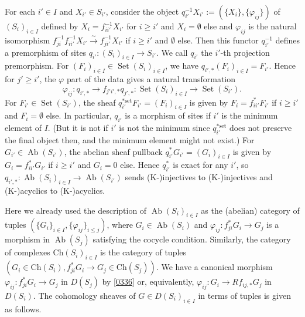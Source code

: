\documentclass{amsart}
\theoremstyle{remark}
\numberwithin{equation}{subsection}
\newcommand{\isomto}{\overset{\sim}{\to}}
\newcommand{\set}{\mathrm{set}}
\newcommand{\Ch}{\mathrm{Ch}}
\DeclareMathOperator{\Ab}{Ab}
\DeclareMathOperator{\Set}{Set}
\begin{document}
For each $i' \in I$ and $X_{i'} \in S_{i'}$,
consider the object $q_{i'}^{-1} X_{i'} := (\{X_{i}\}, \{\varphi_{i j}\})$
of $(S_{i})_{i \in I}$ defined by
$X_{i} =  f_{i i'}^{-1} X_{i'}$ for $i \ge i'$ and $X_{i} = \emptyset$ else
and $\varphi_{i j}$ is the natural isomorphism
$f_{j i}^{-1} f_{i i'}^{-1} X_{i'} \isomto f_{j i'}^{-1} X_{i'}$ if $i \ge i'$
and $\emptyset$ else.
Then this functor $q_{i'}^{-1}$ defines a premorphism of sites
$q_{i'} \colon (S_{i})_{i \in I} \to S_{i'}$.
We call $q_{i'}$ the $i'$-th projection premorphism.
For $(F_{i})_{i \in I} \in \Set(S_{i})_{i \in I}$,
we have $q_{i', \ast}(F_{i})_{i \in I} = F_{i'}$.
Hence for $j' \ge i'$, the $\varphi$ part of the data gives a natural transformation
	\begin{equation} \label{0336}
			\varphi_{i j}
		\colon
			q_{i', \ast}
		\to
			f_{j' i', \ast} q_{j', \ast}
		\colon
			\Set(S_{i})_{i \in I}
		\to
			\Set(S_{i'}).
	\end{equation}
For $F_{i'} \in \Set(S_{i'})$,
the sheaf $q_{i'}^{\ast \set} F_{i'} = (F_{i})_{i \in I}$ is given by
$F_{i} = f_{i i'}^{\ast} F_{i'}$ if $i \ge i'$ and $F_{i} = \emptyset$ else.
In particular, $q_{i'}$ is a morphism of sites if $i'$ is the minimum element of $I$.
(But it is not if $i'$ is not the minimum
since $q_{i'}^{\ast \set}$ does not preserve the final object then,
and the minimum element might not exist.)
For $G_{i'} \in \Ab(S_{i'})$,
the abelian sheaf pullback $q_{i'}^{\ast} G_{i'} = (G_{i})_{i \in I}$ is given by
$G_{i} = f_{i i'}^{\ast} G_{i'}$ if $i \ge i'$ and $G_{i} = 0$ else.
Hence $q_{i'}^{\ast}$ is exact for any $i'$,
so $q_{i', \ast} \colon \Ab(S_{i})_{i \in I} \to \Ab(S_{i'})$ sends
(K-)injectives to (K-)injectives and (K-)acyclics to (K-)acyclics.

Here we already used the description of $\Ab(S_{i})_{i \in I}$
as the (abelian) category of tuples
$(\{G_{i}\}_{i \in I}, \{\varphi_{i j}\}_{i \le j})$,
where $G_{i} \in \Ab(S_{i})$ and
$\varphi_{i j} \colon f_{j i}^{\ast} G_{i} \to G_{j}$ is a morphism in $\Ab(S_{j})$
satisfying the cocycle condition.
Similarly, the category of complexes $\Ch(S_{i})_{i \in I}$ is the category of tuples
$(G_{i} \in \Ch(S_{i}), f_{j i}^{\ast} G_{i} \to G_{j} \in \Ch(S_{j}))$.
We have a canonical morphism
$\varphi_{i j} \colon f_{j i}^{\ast} G_{i} \to G_{j}$ in $D(S_{j})$ by \eqref{0336}
or, equivalently, $\varphi_{i j} \colon G_{i} \to R f_{i j, \ast} G_{j}$ in $D(S_{i})$.
The cohomology sheaves of $G \in D(S_{i})_{i \in I}$ in terms of tuples is given as follows.
\end{document}
